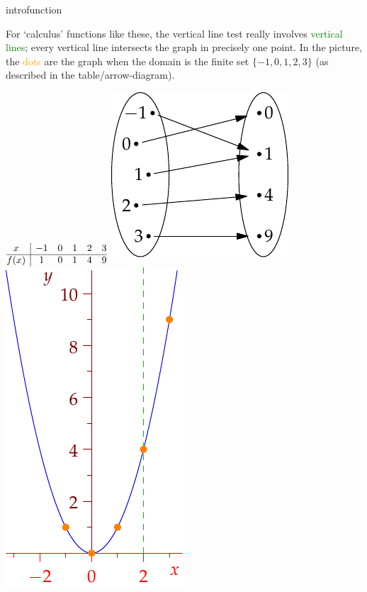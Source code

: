 \begin{example}{}{introfunction}
\begin{description}
\begin{minipage}[t]{0.71\linewidth}
			For `calculus' functions like these, the vertical line test really involves \textcolor{Green}{vertical lines}; every vertical line intersects the graph in precisely one point.
			\smallbreak
			In the picture, the \textcolor{orange}{dots} are the graph when the domain is the finite set $\{-1,0,1,2,3\}$ (as described in the table/arrow-diagram).
	  \end{minipage}
	  \hfill
	  \begin{minipage}[t]{0.28\linewidth}\vspace{0pt}
	  	\flushright
	  	$\begin{array}{@{}c|ccccc@{}}
				x&-1&0&1&2&3\\\hline
				f(x)&1&0&1&4&9
			\end{array}$
			\bigbreak
			\includegraphics[scale=0.95]{functions-quad2}\bigbreak
			\includegraphics[scale=0.95]{functions-quad}
	  \end{minipage}
	\end{description}
\end{example}


